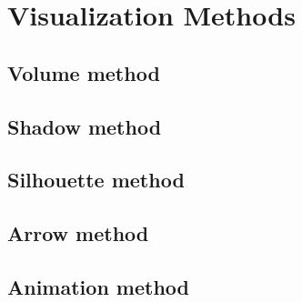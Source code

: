 \chapter{Visualization Methods}
\label{Chapter3}

\section{Volume method}

\section{Shadow method}

\section{Silhouette method}

\section{Arrow method}

\section{Animation method}
